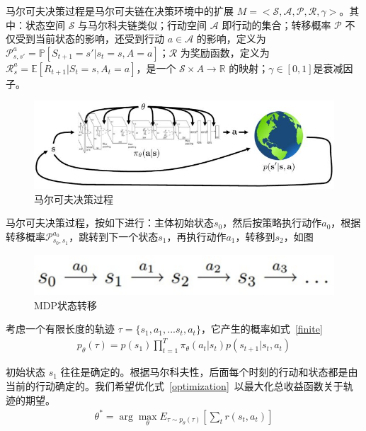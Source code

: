 马尔可夫决策过程是马尔可夫链在决策环境中的扩展 $M=<\mathcal{S}, \mathcal{A}, \mathcal{P}, \mathcal{R}, \gamma>$。其中：状态空间 $\mathcal{S}$ 与马尔科夫链类似；行动空间 $\mathcal{A}$ 即行动的集合；转移概率 $\mathcal{P}$ 不仅受到当前状态的影响，还受到行动 $a\in \mathcal{A}$ 的影响，定义为$\mathcal{P}_{s, s'}^{a}=\mathbb{P}[S_{t+1}=s'|s_t=s, A=a]$；$\mathcal{R}$ 为奖励函数，定义为$\mathcal{R}_{s}^{a}=\mathbb{E}[R_{t+1}|S_t=s, A_t=a]$，是一个 $\mathcal{S}\times A\to \mathbb{R}$ 的映射；$\gamma \in [0,1]$是衰减因子。

\begin{figure}[!htbp]\centering
\vspace{1em}
  \includegraphics[width=0.9\linewidth]{figures/MDP.jpg}
  \caption{马尔可夫决策过程} 
  \label{fig:MDP}       %
  \vspace{1em}
\end{figure}


马尔可夫决策过程，按如下进行：主体初始状态$s_0$，然后按策略执行动作$a_0$，根据转移概率$\mathcal{P}_{s_0, s_1}^{a_0}$，跳转到下一个状态$s_1$，再执行动作$a_1$，转移到$s_2$，如图
\begin{figure}[!htbp]\centering
\vspace{1em}
  \includegraphics[width=0.9\linewidth]{figures/MDP_trans}
  \caption{MDP状态转移} 
  \label{fig:MDP}       %
  \vspace{1em}
\end{figure}

考虑一个有限长度的轨迹 $\tau=\{s_1,a_1,...s_t,a_t\}$，它产生的概率如式~\eqref{finite}~
\begin{equation}
\label{finite}
\begin{aligned}
p_\theta(\tau) = p(s_1)\prod_{t=1}^T \pi_\theta(a_t|s_t)p(s_{t+1}|s_t,a_t)
\end{aligned}
\end{equation}

初始状态 $s_1$ 往往是确定的。根据马尔科夫性，后面每个时刻的行动和状态都是由当前的行动确定的。我们希望优化式~\eqref{optimization}~以最大化总收益函数关于轨迹的期望。
\begin{equation}
\label{optimization}
\begin{aligned}
\theta^* = \arg\max_\theta E_{\tau\sim p_\theta(\tau)}[\sum_t r(s_t, a_t)]
\end{aligned}
\end{equation}


